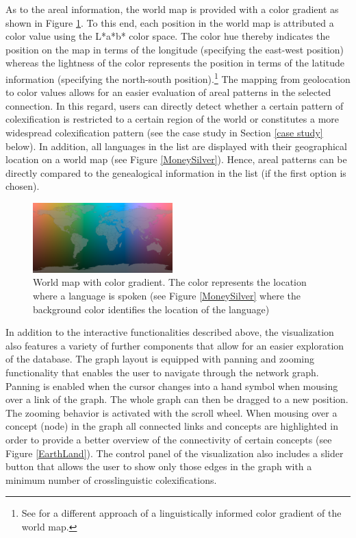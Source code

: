 As to the areal information, the world map is provided with a color gradient as shown in Figure \ref{World map}. To this end, each position in the world map is attributed a color value using the L*a*b* color space. The color hue thereby indicates the position on the map in terms of the longitude (specifying the east-west position) whereas the lightness of the color represents the position in terms of the latitude information (specifying the north-south position).\footnote{See  for a different approach of a linguistically informed color gradient of the world map.}
The mapping from geolocation to color values allows for an easier evaluation of areal patterns in the selected connection. In this regard, users can directly detect whether a certain pattern of colexification is restricted to a certain region of the world or constitutes a more widespread colexification pattern (see the case study in Section \ref{case study} below). In addition, all languages in the list are displayed with their geographical location on a world map (see Figure \ref{MoneySilver}). Hence, areal patterns can be directly compared to the genealogical information in the list (if the first option is chosen).

\begin{figure}[htbp]
\begin{center}
\includegraphics[width=0.48\textwidth]{img/ColorScaleWorld.png}
\caption{World map with color gradient. The color represents the location where a language is spoken (see Figure \ref{MoneySilver} where the background color identifies the location of the language)
}
\label{World map}
\end{center}
\end{figure}



In addition to the interactive functionalities described above, the visualization also features a variety of further components that allow for an easier exploration of the database. The graph layout is equipped with panning and zooming functionality that enables the user to navigate through the network graph. Panning is enabled when the cursor changes into a hand symbol when mousing over a link of the graph. The whole graph can then be dragged to a new position. The zooming behavior is activated with the scroll wheel. 
When mousing over a concept (node) in the graph all connected links and concepts are highlighted
in order to provide a better overview of the connectivity of certain concepts (see Figure \ref{EarthLand}). The control panel of the visualization also includes a slider button that allows the user to show only those edges in the graph with a minimum number of crosslinguistic colexifications. 

